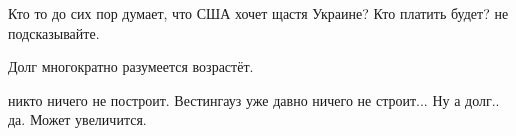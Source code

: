 \begin{itemize}
 
Кто то до сих пор думает, что США хочет щастя Украине? Кто платить будет? не подсказывайте.

 
Долг многократно разумеется возрастёт.

 
никто ничего не построит. Вестингауз уже давно ничего не строит... Ну а долг.. да. Может увеличится.


\end{itemize}

